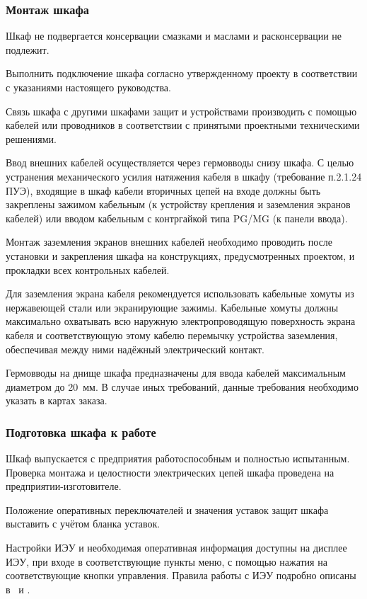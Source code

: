 \subsubsection{Монтаж шкафа}
\begin{enumsubsub}
\item Шкаф не подвергается консервации смазками и маслами и расконсервации не подлежит.
\item Выполнить подключение шкафа согласно утвержденному проекту в соответствии с указаниями настоящего руководства.
\item Связь шкафа с другими шкафами защит и устройствами производить с помощью кабелей или проводников в соответствии с принятыми проектными техническими решениями.
\item Ввод внешних кабелей осуществляется через гермовводы снизу шкафа. С целью устранения механического усилия натяжения кабеля в шкафу (требование п.2.1.24 ПУЭ), входящие в шкаф кабели вторичных цепей на входе должны быть закреплены зажимом кабельным (к устройству крепления и заземления экранов кабелей) или вводом кабельным с контргайкой типа PG/MG (к панели ввода).
\item Монтаж заземления экранов внешних кабелей необходимо проводить после установки и закрепления шкафа на конструкциях, предусмотренных проектом, и прокладки всех контрольных кабелей.
\item Для заземления экрана кабеля рекомендуется использовать кабельные хомуты из нержавеющей стали или экранирующие зажимы. Кабельные хомуты должны максимально охватывать всю наружную электропроводящую поверхность экрана кабеля и соответствующую этому кабелю перемычку устройства заземления, обеспечивая между ними надёжный электрический контакт.
\item Гермовводы на днище шкафа предназначены для ввода кабелей максимальным диаметром до 20~мм. В случае иных требований, данные требования необходимо указать в картах заказа.
%
\end{enumsubsub}

\subsubsection{Подготовка шкафа к работе}
\begin{enumsubsub}
\item Шкаф выпускается с предприятия работоспособным и полностью испытанным. Проверка монтажа и целостности электрических цепей шкафа проведена на предприятии-изготовителе.
\item Положение оперативных переключателей и значения уставок защит шкафа выставить с учётом бланка уставок.
\item Настройки ИЭУ и необходимая оперативная информация доступны на дисплее ИЭУ, при входе в соответствующие пункты меню, с помощью нажатия на соответствующие кнопки управления. Правила работы с ИЭУ подробно описаны в \ManualUnitGeneral~и \ManualUnitDefinite.
\end{enumsubsub}

